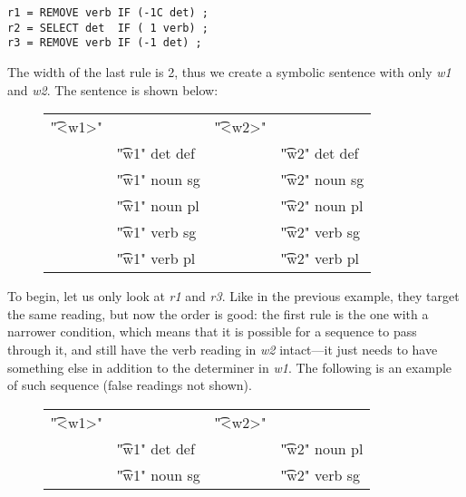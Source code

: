 \begin{verbatim}
r1 = REMOVE verb IF (-1C det) ;
r2 = SELECT det  IF ( 1 verb) ;
r3 = REMOVE verb IF (-1 det) ;
\end{verbatim}

\noindent The width of the last rule is 2, thus we create a symbolic sentence with only {\em w1} and {\em w2}. The sentence is shown below:

\begin{figure}[h]
\centering 
\begin{tabular}{p{0.6cm} l  p{0.6cm} l }
\t{"<w1>"}    &                     &  \t{"<w2>"}  &           \\
              & \t{"w1" det def}    & &      \t{"w2" det def}  \\
              & \t{"w1" noun sg}    & &      \t{"w2" noun sg}  \\
              & \t{"w1" noun pl}    & &      \t{"w2" noun pl}  \\
              & \t{"w1" verb sg}    & &      \t{"w2" verb sg}  \\
              & \t{"w1" verb pl}    & &      \t{"w2" verb pl}  \\
\end{tabular}
\end{figure}


To begin, let us only look at {\em r1} and {\em r3}. Like in the previous example, they target the same reading, but now the order is good: the first rule is the one with a narrower condition, which means that it is possible for a sequence to pass through it, and still have the verb reading in {\em w2} intact---it just needs to have something else in addition to the determiner in {\em w1}.
The following is an example of such sequence (false readings not shown). %

\begin{figure}[h]
\centering
\begin{tabular}{p{0.6cm} l  p{0.6cm} l }
\t{"<w1>"}    &                     &  \t{"<w2>"}  &           \\
              & \t{"w1" det def}    & &      \t{"w2" noun pl}  \\
              & \t{"w1" noun sg}    & &      \t{"w2" verb sg}  \\
\end{tabular}
\end{figure}


